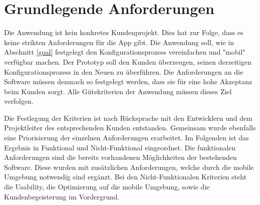 \section{Grundlegende Anforderungen}
Die Anwendung ist kein konkretes Kundenprojekt. Dies hat zur Folge, dass es keine strikten Anforderungen für die App gibt. Die Anwendung soll, wie in Abschnitt \ref{goal} festgelegt den Konfigurationsprozess vereinfachen und "mobil" verfügbar machen. Der Prototyp soll den Kunden überzeugen, seinen derzeitigen Konfigurationsprozess in den Neuen zu überführen. Die Anforderungen an die Software müssen demnach so festgelegt werden, dass sie für eine hohe Akzeptanz beim Kunden sorgt. Alle Gütekriterien der Anwendung müssen dieses Ziel verfolgen. \par

Die Festlegung der Kriterien ist nach Rücksprache mit den Entwicklern und dem Projektleiter des entsprechenden Kunden entstanden. Gemeinsam wurde ebenfalls eine Priorisierung der einzelnen Anforderungen erarbeitet. Im Folgenden ist das Ergebnis in Funktional und Nicht-Funktional eingeordnet. Die funktionalen Anforderungen sind die bereits vorhandenen Möglichkeiten der bestehenden Software. Diese wurden mit zusätzlichen Anforderungen, welche durch die mobile Umgebung notwendig sind ergänzt. Bei den Nicht-Funktionalen Kriterien steht die Usability, die Optimierung auf die mobile Umgebung, sowie die Kundenbegeisterung im Vordergrund.

